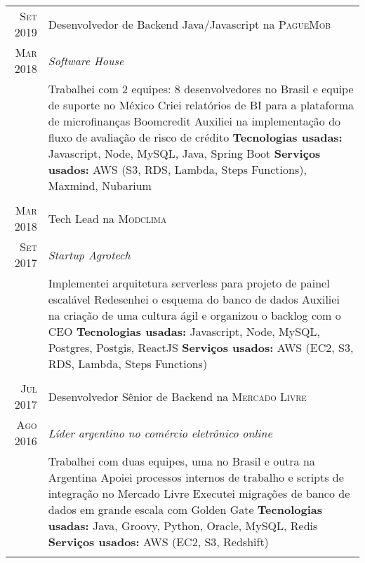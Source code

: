 \documentclass[a4paper,10pt]{article}
\begin{document}
\begin{tabular}{r|p{11cm}}
 \textsc{ Set 2019 } & Desenvolvedor de Backend Java/Javascript na \textsc{PagueMob} \\\textsc{Mar 2018}&\emph{Software House }\\&\footnotesize{
  Trabalhei com 2 equipes: 8 desenvolvedores no Brasil e equipe de suporte no México \newline
  Criei relatórios de BI para a plataforma de microfinanças Boomcredit \newline
  Auxiliei na implementação do fluxo de avaliação de risco de crédito \newline
\textbf{Tecnologias usadas:} Javascript, Node, MySQL, Java, Spring Boot\newline
\textbf{Serviços usados:} AWS (S3, RDS, Lambda, Steps Functions), Maxmind, Nubarium }\\\multicolumn{2}{c}{} \\

 \textsc{ Mar 2018 } & Tech Lead na \textsc{Modclima} \\\textsc{Set 2017}&\emph{Startup Agrotech }\\&\footnotesize{
  Implementei arquitetura serverless para projeto de painel escalável\newline
  Redesenhei o esquema do banco de dados\newline
  Auxiliei na criação de uma cultura ágil e organizou o backlog com o CEO\newline
\textbf{Tecnologias usadas:} Javascript, Node, MySQL, Postgres, Postgis, ReactJS\newline
\textbf{Serviços usados:} AWS (EC2, S3, RDS, Lambda, Steps Functions)}\\\multicolumn{2}{c}{} \\

 \textsc{Jul 2017} & Desenvolvedor Sênior de Backend na \textsc{Mercado Livre} \\\textsc{Ago 2016}&\emph{Líder argentino no comércio eletrônico online }\\&\footnotesize{
  Trabalhei com duas equipes, uma no Brasil e outra na Argentina\newline
  Apoiei processos internos de trabalho e scripts de integração no Mercado Livre\newline
  Executei migrações de banco de dados em grande escala com Golden Gate\newline
\textbf{Tecnologias usadas:} Java, Groovy, Python, Oracle, MySQL, Redis\newline
\textbf{Serviços usados:} AWS (EC2, S3, Redshift)}\\\multicolumn{2}{c}{} \\

 
 \end{tabular}
 
\end{document}
